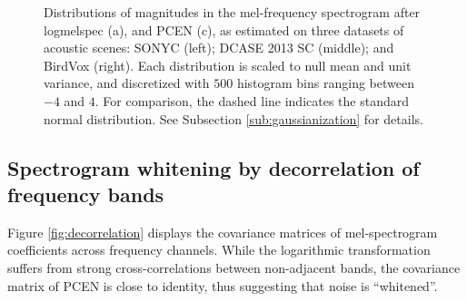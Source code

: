 \documentclass[journal]{IEEEtran}
\theoremstyle{remark}
\begin{document}
\begin{figure}
\caption{Distributions of magnitudes in the mel-frequency spectrogram after logmelspec (a),  and PCEN (c), as estimated on three datasets of acoustic scenes:
SONYC (left); DCASE 2013 SC (middle); and BirdVox (right).
Each distribution is scaled to null mean and unit variance, and discretized with $500$ histogram bins ranging between $-4$ and $4$.
For comparison, the dashed line indicates the standard normal distribution.
See Subsection \ref{sub:gaussianization} for details.}
\label{fig:gaussianization}
\end{figure}

\subsection{Spectrogram whitening by decorrelation of frequency bands}\label{sub:decorrelation}
Figure \ref{fig:decorrelation} displays the covariance matrices of mel-spectrogram coefficients across frequency channels.
While the logarithmic transformation suffers from strong cross-correlations between non-adjacent bands, the covariance matrix of PCEN is close to identity, thus suggesting that noise is  ``whitened''.
\end{document}
